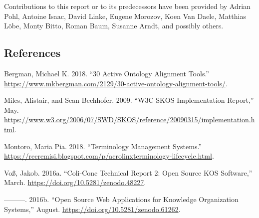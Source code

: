 \documentclass[
  DIV=10]{article}
\newlength{\cslhangindent}
\newenvironment{CSLReferences}[2] %
 {\begin{list}{}{%
  \setlength{\itemindent}{0pt}
  \setlength{\leftmargin}{0pt}
  \setlength{\parsep}{0pt}
  \ifodd #1
   \setlength{\leftmargin}{\cslhangindent}
   \setlength{\itemindent}{-1\cslhangindent}
  \fi
  \setlength{\itemsep}{#2\baselineskip}}}
 {\end{list}}
\begin{document}
Contributions to this report or to its predecessors have been provided
by Adrian Pohl, Antoine Isaac, David Linke, Eugene Morozov, Koen Van
Daele, Matthias Löbe, Monty Bitto, Roman Baum, Susanne Arndt, and
possibly others.

\subsection{References}\label{references}

\label{refs}
\begin{CSLReferences}{1}{0}
Bergman, Michael K. 2018. {``30 Active Ontology Alignment Tools.''}
\url{https://www.mkbergman.com/2129/30-active-ontology-alignment-tools/}.

Miles, Alistair, and Sean Bechhofer. 2009. {``W3C SKOS Implementation
Report,''} May.
\url{https://www.w3.org/2006/07/SWD/SKOS/reference/20090315/implementation.html}.

Montoro, Maria Pia. 2018. {``Terminology Management Systems.''}
\url{https://recremisi.blogspot.com/p/acrolinxterminology-lifecycle.html}.

Voß, Jakob. 2016a. {``Coli-Conc {Technical} {Report} 2: {Open} {Source}
{KOS} Software,''} March. \url{https://doi.org/10.5281/zenodo.48227}.

---------. 2016b. {``Open {Source} Web Applications for {Knowledge}
{Organization} {Systems},''} August.
\url{https://doi.org/10.5281/zenodo.61262}.

\end{CSLReferences}
\end{document}
